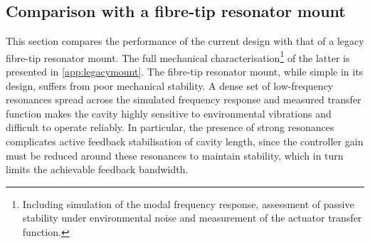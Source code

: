 \documentclass[../Thesis-IJspeert.tex]{subfiles}
\begin{document}
\subsection{Comparison with a fibre-tip resonator mount}
This section compares the performance of the current design with that of a legacy fibre-tip resonator mount. The full mechanical characterisation\footnote{Including simulation of the modal frequency response, assessment of passive stability under environmental noise and measurement of the actuator transfer function.} of the latter is presented in \autoref{app:legacymount}. The fibre-tip resonator mount, while simple in its design, suffers from poor mechanical stability. A dense set of low-frequency resonances spread across the simulated frequency response and measured transfer function makes the cavity highly sensitive to environmental vibrations and difficult to operate reliably. In particular, the presence of strong resonances complicates active feedback stabilisation of cavity length, since the controller gain must be reduced around these resonances to maintain stability, which in turn limits the achievable feedback bandwidth. 
\end{document}
